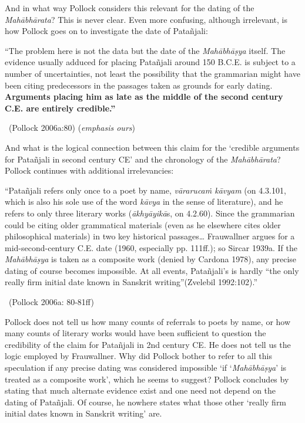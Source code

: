 And in what way Pollock considers this relevant for the dating of the \textit{Mahābhārata}? This is never clear. Even more confusing, although irrelevant, is how Pollock goes on to investigate the date of Patañjali:

\begin{myquote}
“The problem here is not the data but the date of the \textit{Mahābhāṣya} itself. The evidence usually adduced for placing Patañjali around 150 B.C.E. is subject to a number of uncertainties, not least the possibility that the grammarian might have been citing predecessors in the passages taken as grounds for early dating. \textbf{Arguments placing him as late as the middle of the second century C.E. are entirely credible.”} 

~\hfill (Pollock 2006a:80) (\textit{emphasis ours})
\end{myquote}

And what is the logical connection between this claim for the ‘credible arguments for Patañjali in second century CE’ and the chronology of the \textit{Mahābhārata}? Pollock continues with additional irrelevancies:

\begin{myquote}
“Patañjali refers only once to a poet by name, \textit{vārarucaṁ kāvyam} (on 4.3.101, which is also his sole use of the word \textit{kāvya} in the sense of literature), and he refers to only three literary works (\textit{ākhyāyikā}s, on 4.2.60). Since the grammarian could be citing older grammatical materials (even as he elsewhere cites older philosophical materials) in two key historical passages… Frauwallner argues for a mid-second-century C.E. date (1960, especially pp. 111ff.); so Sircar 1939a. If the \textit{Mahābhāṣya} is taken as a composite work (denied by Cardona 1978), any precise dating of course becomes impossible. At all events, Patañjali’s is hardly “the only really ﬁrm initial date known in Sanskrit writing”(Zvelebil 1992:102).” 

~\hfill (Pollock 2006a: 80-81ff)
\end{myquote}

Pollock does not tell us how many counts of referrals to poets by name, or how many counts of literary works would have been sufficient to question the credibility of the claim for Patañjali in 2nd century CE. He does not tell us the logic employed by Frauwallner. Why did Pollock bother to refer to all this speculation if any precise dating was considered impossible ‘if ‘\textit{Mahābhāṣya}’ is treated as a composite work’, which he seems to suggest? Pollock concludes by stating that much alternate evidence exist and one need not depend on the dating of Patañjali. Of course, he nowhere states what those other ‘really firm initial dates known in Sanskrit writing’ are.


